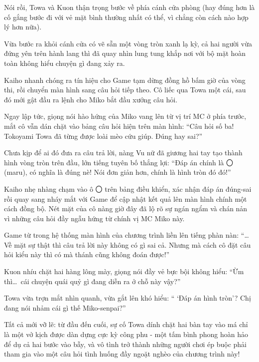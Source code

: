 \documentclass[../main.tex]{subfiles}
\begin{document}
Nói rồi, Towa và Kuon thận trọng bước về phía cánh cửa phòng (hay đúng hơn là cố gắng bước đi với vẻ mặt bình thường nhất có thể, vì chẳng còn cách nào hợp lý hơn nữa).

\ct

Vừa bước ra khỏi cánh cửa có vẽ sẵn một vòng tròn xanh lạ kỳ, cả hai người vừa đứng yên trên hành lang thì đã quay nhìn lung tung khắp nơi với bộ mặt hoàn toàn không hiểu chuyện gì đang xảy ra.

Kaiho nhanh chóng ra tín hiệu cho Game tạm dừng đồng hồ bấm giờ của vòng thi, rồi chuyển màn hình sang câu hỏi tiếp theo. Cô liếc qua Towa một cái, sau đó mới gật đầu ra lệnh cho Miko bắt đầu xướng câu hỏi.

Ngay lập tức, giọng nói hào hứng của Miko vang lên từ vị trí MC ở phía trước, mắt cô vẫn dán chặt vào bảng câu hỏi hiện trên màn hình: ``Câu hỏi số ba! Tokoyami Towa đã từng được loài mèo cứu giúp. Đúng hay sai?''

Chưa kịp để ai đó đưa ra câu trả lời, nàng Vu nữ đã giương hai tay tạo thành hình vòng tròn trên đầu, lớn tiếng tuyên bố thắng lợi: ``Đáp án chính là 〇 (maru), có nghĩa là đúng nè! Nói đơn giản hơn, chính là hình tròn đó đó!''


Kaiho nhẹ nhàng chạm vào ô 〇 trên bảng điều khiển, xác nhận đáp án đúng-sai rồi quay sang nháy mắt với Game để cập nhật kết quả lên màn hình chính một cách đồng bộ. Nét mặt của cô nàng giờ đây đã lộ rõ sự ngán ngẩm và chán nản vì những câu hỏi đầy ngẫu hứng từ chính vị MC Miko này.

Game từ trong hệ thống màn hình của chương trình liền lên tiếng phàn nàn: ``\dots Về mặt sự thật thì câu trả lời này không có gì sai cả. Nhưng mà cách cô đặt câu hỏi kiểu này thì có mà thánh cũng không đoán được!''

Kuon nhíu chặt hai hàng lông mày, giọng nói đầy vẻ bực bội không hiểu: ``Ừm thì\dots\ cái chuyện quái quỷ gì đang diễn ra ở chỗ này vậy?''

Towa vừa trợn mắt nhìn quanh, vừa gắt lên khó hiểu: `` `Đáp án hình tròn'? Chị đang nói nhảm cái gì thế Miko-senpai?''

Tất cả mới vỡ lẽ: từ đầu đến cuối, sự cố Towa dính chặt hai bàn tay vào má chỉ là một vở kịch được dàn dựng cực kỳ công phu - một tấm bình phong hoàn hảo để dụ cả hai bước vào bẫy, và vô tình trở thành những người chơi ép buộc phải tham gia vào một câu hỏi tình huống đầy ngoặt nghèo của chương trình này!

\omk
\end{document}
